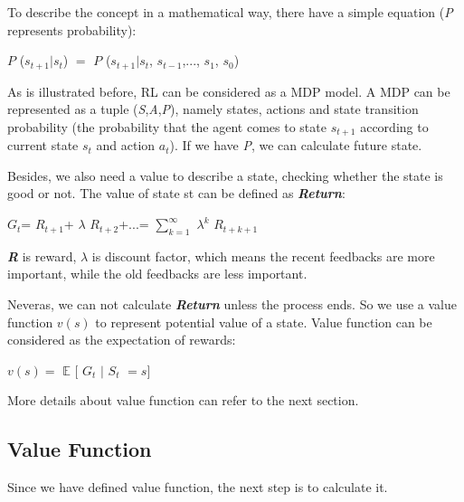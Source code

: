 \documentclass[10pt,twocolumn,letterpaper]{article}
\begin{document}
	To describe the concept in a mathematical way, there have a simple equation (\textit{P} represents probability):
	
	\begin{center}
		$P$
		(\textit{\textbf{$s_{t+1}$}}$|$\textit{\textbf{$s_{t}$}})
		$=$
		$P$
		(\textit{\textbf{$s_{t+1}$}}$|$\textit{\textbf{$s_{t}$}},
		\textbf{\textit{$s_{t-1}$}},...,
		\textbf{\textit{$s_{1}$}},
		\textbf{\textit{$s_{0}$}})
	\end{center}
	
	As is illustrated before, RL can be considered as a MDP model. A MDP can be represented as a tuple (\textit{S},\textit{A},\textit{P}), namely states, actions and state transition probability (the probability that the agent comes to state \textbf{\textit{$s_{t+1}$}} according to current state \textbf{\textit{$s_{t}$}} and action \textbf{\textit{$a_{t}$}}). If we have \textit{P}, we can calculate future state.
	
	Besides, we also need a value to describe a state, checking whether the state is good or not. The value of state st can be defined as \textbf{\textit{Return}}:
	
	\begin{center}
		\textbf{\textit{$G_{t}$}}=
		\textbf{\textit{$R_{t+1}$}}+
		$\lambda$
		\textbf{\textit{$R_{t+2}$}}+$...$=
		$\sum\limits_{k=1}^{\infty}$
		$\lambda^{k}$
		\textbf{\textit{$R_{t+k+1}$}}
	\end{center}
	
	\textbf{\textit{R}} is reward, $\lambda$ is discount factor, which means the recent feedbacks are more important, while the old feedbacks are less important.
	
	Neveras, we can not calculate \textbf{\textit{Return}} unless the process ends. So we use a value function $v(s)$ to represent potential value of a state. Value function can be considered as the expectation of rewards:
	
	\begin{center}
		$v(s)=$
		$\mathbb{E}$
		$[$
		\textbf{\textit{$G_{t}$}}
		$|$
		\textbf{\textit{$S_{t}$}}
		$=s]$
	\end{center}
	
	More details about value function can refer to the next section.
	
	\subsection{Value Function}
	Since we have defined value function, the next step is to calculate it.
	
\end{document}
